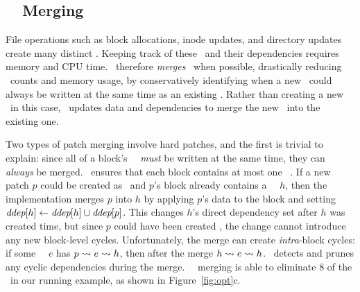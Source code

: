 
\subsection{\Nrb\ \Patch\ Merging}
\label{sec:patch:merge}

File operations such as block allocations, inode updates, and directory updates
create many distinct \patches. Keeping track of these
\patches\ and their dependencies requires memory and
CPU time.
%
\Kudos\ therefore \emph{merges} \patches\ when possible, drastically reducing
\patch\ counts and memory usage, by conservatively identifying when a
new \patch\ could always be written at the same time as an existing \patch.
%
Rather than creating a new \patch\ in this case, \Kudos\ updates data
and dependencies to merge the new \patch\ into the existing one.


Two types of patch merging involve hard patches, and the first is trivial
to explain:
%
since all of a block's \nrb\ \patches\ \emph{must} be written at the same
time, they can \emph{always} be merged.
%
\Kudos\ ensures that each block contains at most one \nrb\ \patch.
%
If a new patch $p$ could be created as \nrb\ and $p$'s
block already contains a \nrb\ \patch\ $h$, then
%
the implementation merges $p$ into $h$ by applying $p$'s data to the block
and setting $\textit{ddep}[h] \gets \textit{ddep}[h] \cup \textit{ddep}[p]$.
%
%
This changes $h$'s direct dependency set after $h$ was created time, but
since $p$ could have been created \nrb, the change cannot introduce any new
block-level cycles.
%
Unfortunately, the merge can create \emph{intra}-block cycles:
%
if some \noop\ \patch\ $e$ has $p \leadsto e \leadsto h$, then after
the merge $h \leadsto e \leadsto h$.
%
\Kudos\ detects and prunes any cyclic
dependencies during the merge.
%
\Nrb\ \patch\ merging is able to eliminate 8 of the \patches\ in our running
example, as shown in Figure~\ref{fig:opt}c.



